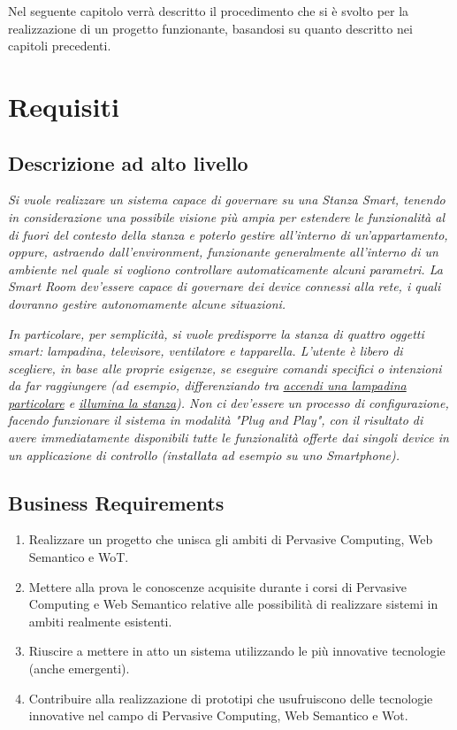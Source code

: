 \documentclass[12pt,a4paper,openright,oneside]{report}
\begin{document}
Nel seguente capitolo verrà descritto il procedimento che si è svolto per la realizzazione di un progetto funzionante, basandosi su quanto descritto nei capitoli precedenti.

\section{Requisiti}

\subsection{Descrizione ad alto livello}
\textsl{Si vuole realizzare un sistema capace di governare su una Stanza Smart, tenendo in considerazione una possibile visione più ampia per estendere le funzionalità al di fuori del contesto della stanza e poterlo gestire all'interno di un'appartamento, oppure, astraendo dall'environment, funzionante generalmente all'interno di un ambiente nel quale si vogliono controllare automaticamente alcuni parametri. La Smart Room dev'essere capace di governare dei device connessi alla rete, i quali dovranno gestire autonomamente alcune situazioni.\\}

\textsl{In particolare, per semplicità, si vuole predisporre la stanza di quattro oggetti smart: lampadina, televisore, ventilatore e tapparella. L'utente è libero di scegliere, in base alle proprie esigenze, se eseguire comandi specifici o intenzioni da far raggiungere (ad esempio, differenziando tra \ul{accendi una lampadina particolare} e \ul{illumina la stanza}). Non ci dev'essere un processo di configurazione, facendo funzionare il sistema in modalità "Plug and Play", con il risultato di avere immediatamente disponibili tutte le funzionalità offerte dai singoli device in un applicazione di controllo (installata ad esempio su uno Smartphone).}

\subsection{Business Requirements}
\begin{enumerate}
	\item Realizzare un progetto che unisca gli ambiti di Pervasive Computing, Web Semantico e WoT.
	
	\item Mettere alla prova le conoscenze acquisite durante i corsi di Pervasive Computing e Web Semantico relative alle possibilità di realizzare sistemi in ambiti realmente esistenti.
	
	\item Riuscire a mettere in atto un sistema utilizzando le più innovative tecnologie (anche emergenti).
	
	\item Contribuire alla realizzazione di prototipi che usufruiscono delle tecnologie innovative nel campo di Pervasive Computing, Web Semantico e Wot.
\end{enumerate}
\end{document}
